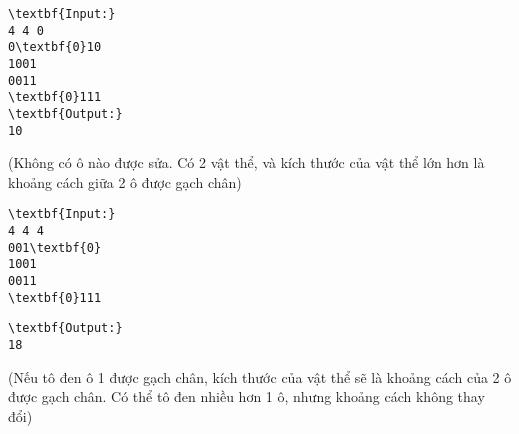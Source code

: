 \begin{verbatim}
\textbf{Input:}
4 4 0
0\textbf{0}10
1001
0011
\textbf{0}111
\textbf{Output:}
10\end{verbatim}

(Không có ô nào được sửa. Có 2 vật thể, và kích thước của vật thể lớn hơn là khoảng cách giữa 2 ô được gạch chân)
\begin{verbatim}
\textbf{Input:}
4 4 4
001\textbf{0}
1001
0011
\textbf{0}111\end{verbatim}
\begin{verbatim}
\textbf{Output:}
18\end{verbatim}

(Nếu tô đen ô 1 được gạch chân, kích thước của vật thể sẽ là khoảng cách của 2 ô được gạch chân. Có thể tô đen nhiều hơn 1 ô, nhưng khoảng cách không thay đổi)